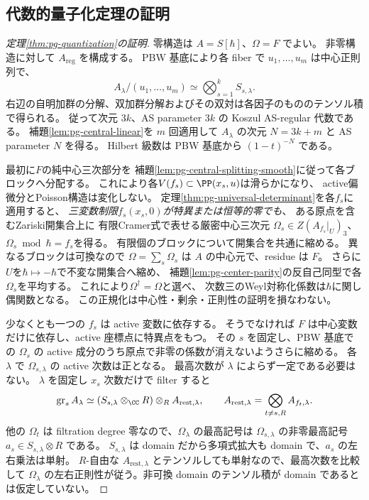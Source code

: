 \subsection{代数的量子化定理の証明}
\begin{proof}[定理\ref{thm:pg-quantization}の証明]
零構造は $A=S[\hbar]$、$\Omega=F$ でよい。
非零構造に対して $A_{\mathrm{reg}}$ を構成する。
PBW 基底により各 fiber で $u_1,\ldots,u_m$ は中心正則列で、
\begin{equation}
A_\lambda/(u_1,\ldots,u_m)\simeq\bigotimes_{s=1}^kS_{s,\lambda}.
\end{equation}
右辺の自明加群の分解、双加群分解およびその双対は各因子のもののテンソル積で得られる。
従って次元 $3k$、AS parameter $3k$ の Koszul AS-regular 代数である。
補題\ref{lem:pg-central-linear}を $m$ 回適用して $A_\lambda$ の次元 $N=3k+m$ と AS parameter $N$ を得る。
Hilbert 級数は PBW 基底から $(1-t)^{-N}$ である。

最初に$F$の純中心三次部分を
補題\ref{lem:pg-central-splitting-smooth}に従って各ブロックへ分配する。
これにより各$V(f_s)\subset\PP(x_s,u)$は滑らかになり、
active偏微分とPoisson構造は変化しない。
定理\ref{thm:pg-universal-determinant}を各$f_s$に適用すると、
\emph{三変数制限$f_s(x_s,0)$が特異または恒等的零でも}、
ある原点を含むZariski開集合上に
有限Cramer式で表せる厳密中心三次元
$\Omega_s\in Z(A_{f_s}|_U)_3$、
$\Omega_s\bmod\hbar=f_s$を得る。
有限個のブロックについて開集合を共通に縮める。
異なるブロックは可換なので $\Omega=\sum_s\Omega_s$ は $A$ の中心元で、residue は $F$。
さらに$U$を$\hbar\mapsto-\hbar$で不変な開集合へ縮め、
補題\ref{lem:pg-center-parity}の反自己同型で各$\Omega_s$を平均する。
これにより$\Omega^\dagger=\Omega$と選べ、
次数三のWeyl対称化係数は$\hbar$に関し偶関数となる。
この正規化は中心性・剰余・正則性の証明を損なわない。

少なくとも一つの $f_s$ は active 変数に依存する。
そうでなければ $F$ は中心変数だけに依存し、active 座標点に特異点をもつ。
その $s$ を固定し、PBW 基底での $\Omega_s$ の active 成分のうち原点で非零の係数が消えないようさらに縮める。
各 $\lambda$ で $\Omega_{s,\lambda}$ の active 次数は正となる。
最高次数が $\lambda$ によらず一定である必要はない。
$\lambda$ を固定し $x_s$ 次数だけで filter すると
\begin{equation}
\operatorname{gr}_sA_\lambda\simeq
(S_{s,\lambda}\otimes_\CC R)\otimes_R A_{\mathrm{rest},\lambda},
\qquad A_{\mathrm{rest},\lambda}=\bigotimes_{t\neq s,R}A_{f_t,\lambda}.
\end{equation}
他の $\Omega_t$ は filtration degree 零なので、$\Omega_\lambda$ の最高記号は
$\Omega_{s,\lambda}$ の非零最高記号 $a_s\in S_{s,\lambda}\otimes R$ である。
$S_{s,\lambda}$ は domain だから多項式拡大も domain で、$a_s$ の左右乗法は単射。
$R$-自由な $A_{\mathrm{rest},\lambda}$ とテンソルしても単射なので、最高次数を比較して
$\Omega_\lambda$ の左右正則性が従う。非可換 domain のテンソル積が domain であるとは仮定していない。


\end{proof}
